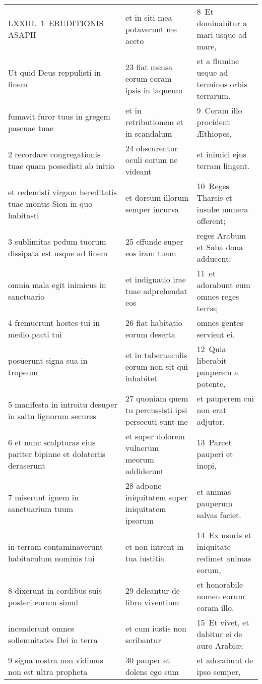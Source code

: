 \documentclass{article}
\begin{document}
\begin{longtable}{@{}p{}p{}p{}@{}}
LXXIII. 1 ERUDITIONIS ASAPH	&	et in siti mea potaverunt me aceto	&	8 Et dominabitur a mari usque ad mare,	\\
Ut quid Deus reppulisti in finem	&	23 fiat mensa eorum coram ipsis in laqueum	&	et a flumine usque ad terminos orbis terrarum.	\\
fumavit furor tuus in gregem pascuae tuae	&	et in retributionem et in scandalum	&	9 Coram illo procident Æthiopes,	\\
2 recordare congregationis tuae quam possedisti ab initio	&	24 obscurentur oculi eorum ne videant	&	et inimici ejus terram lingent.	\\
et redemisti virgam hereditatis tuae montis Sion in quo habitasti	&	et dorsum illorum semper incurva	&	10 Reges Tharsis et insulæ munera offerent;	\\
3 sublimitas pedum tuorum dissipata est usque ad finem	&	25 effunde super eos iram tuam	&	reges Arabum et Saba dona adducent:	\\
omnia mala egit inimicus in sanctuario	&	et indignatio irae tuae adprehendat eos	&	11 et adorabunt eum omnes reges terræ;	\\
4 fremuerunt hostes tui in medio pacti tui	&	26 fiat habitatio eorum deserta	&	omnes gentes servient ei.	\\
posuerunt signa sua in tropeum	&	et in tabernaculis eorum non sit qui inhabitet	&	12 Quia liberabit pauperem a potente,	\\
5 manifesta in introitu desuper in saltu lignorum secures	&	27 quoniam quem tu percussisti ipsi persecuti sunt me	&	et pauperem cui non erat adjutor.	\\
6 et nunc scalpturas eius pariter bipinne et dolatoriis deraserunt	&	et super dolorem vulnerum meorum addiderunt	&	13 Parcet pauperi et inopi,	\\
7 miserunt ignem in sanctuarium tuum	&	28 adpone iniquitatem super iniquitatem ipsorum	&	et animas pauperum salvas faciet.	\\
in terram contaminaverunt habitaculum nominis tui	&	et non intrent in tua iustitia	&	14 Ex usuris et iniquitate redimet animas eorum,	\\
8 dixerunt in cordibus suis posteri eorum simul	&	29 deleantur de libro viventium	&	et honorabile nomen eorum coram illo.	\\
incenderunt omnes sollemnitates Dei in terra	&	et cum iustis non scribantur	&	15 Et vivet, et dabitur ei de auro Arabiæ;	\\
9 signa nostra non vidimus non est ultra propheta	&	30 pauper et dolens ego sum	&	et adorabunt de ipso semper,	\\

\end{longtable}
\end{document}
